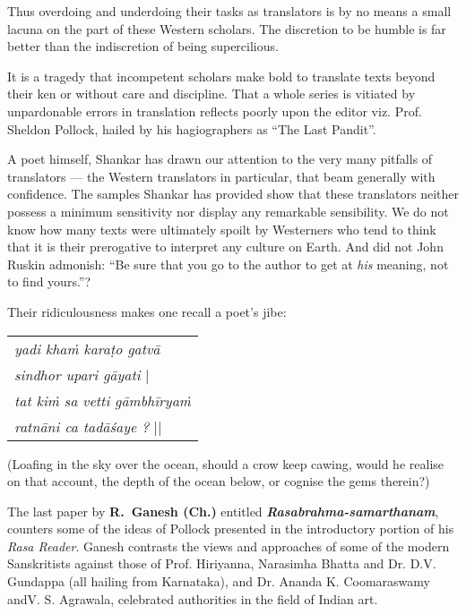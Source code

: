 Thus overdoing and underdoing their tasks as translators is by no means a small lacuna on the part of these Western scholars. The discretion to be humble is far better than the indiscretion of being supercilious.

It is a tragedy that incompetent scholars make bold to translate texts beyond their ken or without care and discipline. That a whole series is vitiated by unpardonable errors in translation reflects poorly upon the editor viz. Prof. Sheldon Pollock, hailed by his hagiographers as “The Last Pandit”.

A poet himself, Shankar has drawn our attention to the very many pitfalls of translators --- the Western translators in particular, that beam generally with confidence. The samples Shankar has provided show that these translators neither possess a minimum sensitivity nor display any remarkable sensibility. We do not know how many texts were ultimately spoilt by Westerners who tend to think that it is their prerogative to interpret any culture on Earth. And did not John Ruskin admonish: ``Be sure that you go to the author to get at \textsl{his} meaning, not to find yours.''?

Their ridiculousness makes one recall a poet's jibe:
\begin{center}
\begin{tabular}{l}
\textsl{yadi khaṁ karaṭo gatvā}\\
\phantom{aaaaaa}\textsl{sindhor upari gāyati} |\\
\textsl{tat kiṁ sa vetti gāmbhīryaṁ}\\
\phantom{aaaaaa}\textsl{ratnāni ca tadāśaye ?} ||
\end{tabular}
\end{center}
(Loafing in the sky over the ocean, should a crow keep cawing, would he realise on that account, the depth of the ocean below, or cognise the gems therein?) 

The last paper by {\bf R.~Ganesh (Ch.)} entitled \textbf{\textsl{Rasabrahma-samartha\-nam}}, counters some of the ideas of Pollock presented in the introductory portion of his \textsl{Rasa Reader}. Ganesh contrasts the views and approaches of some of the modern Sanskritists against those of Prof. Hiriyanna, Narasimha Bhatta and Dr. D.V. Gundappa (all hailing from Karnataka), and Dr. Ananda K. Coomaraswamy and\break V. S. Agrawala, celebrated authorities in the field of Indian art.

